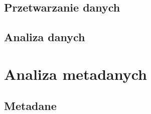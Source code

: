 	\subsection{Przetwarzanie danych} \label{subsec:1PrzetwarzanieDanych}
	\subsection{Analiza danych} \label{subsec:1AnalizaDanych}

\section{Analiza metadanych} \label{sec:1AnalizaMetadanych}
	\subsection{Metadane} \label{subsec:1Metadane}